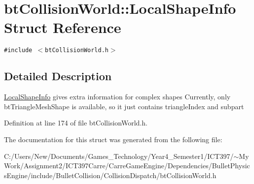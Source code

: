 \hypertarget{structbt_collision_world_1_1_local_shape_info}{
\section{btCollisionWorld::LocalShapeInfo Struct Reference}
\label{structbt_collision_world_1_1_local_shape_info}
}
{\tt \#include $<$btCollisionWorld.h$>$}



\subsection{Detailed Description}
\hyperlink{structbt_collision_world_1_1_local_shape_info}{LocalShapeInfo} gives extra information for complex shapes Currently, only btTriangleMeshShape is available, so it just contains triangleIndex and subpart 

Definition at line 174 of file btCollisionWorld.h.

The documentation for this struct was generated from the following file:\begin{CompactItemize}
\item 
C:/Users/New/Documents/Games\_\-Technology/Year4\_\-Semester1/ICT397/$\sim$My Work/Assignment2/ICT397Carre/CarreGameEngine/Dependencies/BulletPhysicsEngine/include/BulletCollision/CollisionDispatch/btCollisionWorld.h\end{CompactItemize}
